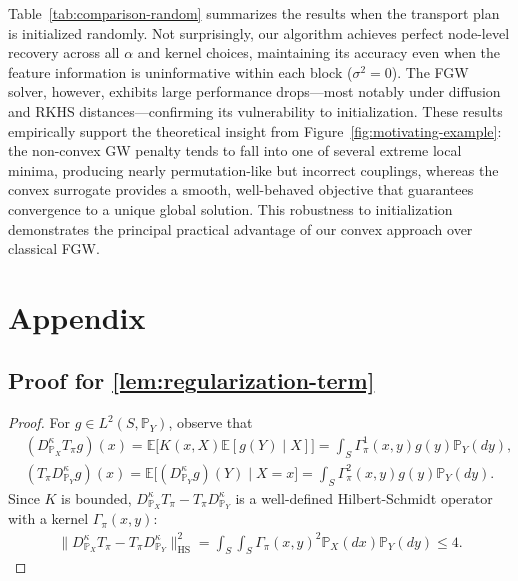 \documentclass{article}
\begin{document}
Table~\ref{tab:comparison-random} summarizes the results when the transport plan is initialized randomly. Not surprisingly, our algorithm achieves perfect node-level recovery across all $\alpha$ and kernel choices, maintaining its accuracy even when the feature information is uninformative within each block ($\sigma^2=0$). The FGW solver, however, exhibits large performance drops—most notably under diffusion and RKHS distances—confirming its vulnerability to initialization. These results empirically support the theoretical insight from Figure~\ref{fig:motivating-example}: the non-convex GW penalty tends to fall into one of several extreme local minima, producing nearly permutation-like but incorrect couplings, whereas the convex surrogate provides a smooth, well-behaved objective that guarantees convergence to a unique global solution. This robustness to initialization demonstrates the principal practical advantage of our convex approach over classical FGW.








\appendix
\section{Appendix}
\subsection{Proof for \cref{lem:regularization-term}}\label{pf:lem:regularization-term}
\begin{proof}
	For $g \in L^2(S,\mathbb{P}_Y)$, observe that
	\begin{align*}
		&(D_{\mathbb{P}_X}^{\kappa}T_{\pi}g)(x) = \mathbb{E}\Big[K(x,X)\mathbb{E}\left[g(Y) \mid X\right]\Big] = \int_S \Gamma_\pi^1(x,y)g(y)\mathbb{P}_Y(dy) , \\
		&(T_{\pi}D_{\mathbb{P}_Y}^{\kappa}g)(x) = \mathbb{E}\Big[(D_{\mathbb{P}_Y}^{\kappa}g)(Y) \mid X = x\Big] = \int_S \Gamma_\pi^2(x,y)g(y) \mathbb{P}_Y(dy) .
	\end{align*}
	Since $K$ is bounded, $D_{\mathbb{P}_X}^{\kappa}T_{\pi} - T_{\pi}D_{\mathbb{P}_Y}^{\kappa}$ is a well-defined Hilbert-Schmidt operator with a kernel $\Gamma_\pi(x,y)$:
	\begin{align*}
		\| D_{\mathbb{P}_X}^{\kappa}T_{\pi} - T_{\pi}D_{\mathbb{P}_Y}^{\kappa} \|_{\mathrm{HS}}^2 = \int_S\int_S \Gamma_\pi(x,y)^2\mathbb{P}_X(dx)\mathbb{P}_Y(dy) \leq 4 .
	\end{align*}
\end{proof}
\end{document}
